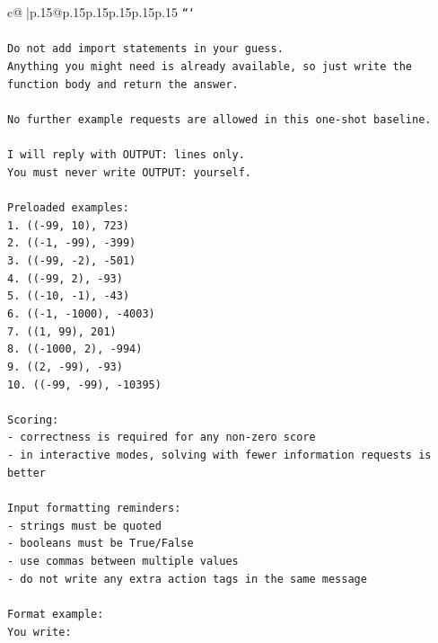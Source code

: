 \documentclass{article}
\begin{document}
{\begin{supertabular}{c@{$\;$}|p{.15\linewidth}@{}p{.15\linewidth}p{.15\linewidth}p{.15\linewidth}p{.15\linewidth}p{.15\linewidth}}
{{{\texttt{```} \\
\\ 
\texttt{Do not add import statements in your guess.} \\
\texttt{Anything you might need is already available, so just write the function body and return the answer.} \\
\\ 
\texttt{No further example requests are allowed in this one{-}shot baseline.} \\
\\ 
\texttt{I will reply with OUTPUT: lines only.} \\
\texttt{You must never write OUTPUT: yourself.} \\
\\ 
\texttt{Preloaded examples:} \\
\texttt{1. (({-}99, 10), 723)} \\
\texttt{2. (({-}1, {-}99), {-}399)} \\
\texttt{3. (({-}99, {-}2), {-}501)} \\
\texttt{4. (({-}99, 2), {-}93)} \\
\texttt{5. (({-}10, {-}1), {-}43)} \\
\texttt{6. (({-}1, {-}1000), {-}4003)} \\
\texttt{7. ((1, 99), 201)} \\
\texttt{8. (({-}1000, 2), {-}994)} \\
\texttt{9. ((2, {-}99), {-}93)} \\
\texttt{10. (({-}99, {-}99), {-}10395)} \\
\\ 
\texttt{Scoring:} \\
\texttt{{-} correctness is required for any non{-}zero score} \\
\texttt{{-} in interactive modes, solving with fewer information requests is better} \\
\\ 
\texttt{Input formatting reminders:} \\
\texttt{{-} strings must be quoted} \\
\texttt{{-} booleans must be True/False} \\
\texttt{{-} use commas between multiple values} \\
\texttt{{-} do not write any extra action tags in the same message} \\
\\ 
\texttt{Format example:} \\
\texttt{You write:} \\
}}}
\end{supertabular}}
\end{document}

